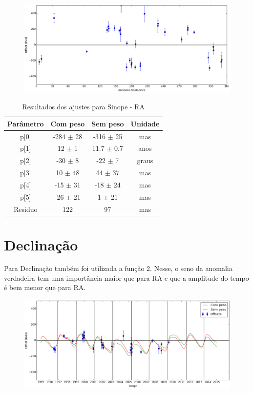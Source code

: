 \documentclass[11pt,a4paper]{report}
\begin{document}
\begin{figure}[h]
\includegraphics[scale=0.45]{Sinope/RA_anom.png}  
\end{figure}


\begin{table}[h!]
\caption{\label{Tab: Sinope-RA} Resultados dos ajustes para Sinope - RA}
\begin{centering}
\begin{tabular}{cccc}
\hline
\hline
Parâmetro & Com peso & Sem peso & Unidade\tabularnewline
\hline
p[0] & -284 $\pm$ 28 & -316 $\pm$ 25 & mas\\
p[1] & 12 $\pm$ 1 & 11.7 $\pm$ 0.7 & anos\\
p[2] & -30 $\pm$ 8 & -22 $\pm$ 7 & graus\\
p[3] & 10 $\pm$ 48 & 44 $\pm$ 37 & mas\\
p[4] & -15 $\pm$ 31 & -18 $\pm$ 24 & mas\\
p[5] & -26 $\pm$ 21 & 1 $\pm$ 21 & mas\\
Residuo & 122 & 97 & mas\\
\hline 
\end{tabular} 
\par\end{centering}
\end{table}

\section*{Declinação}

\indent \indent Para Declinação também foi utilizada a função 2. Nesse, o seno da anomalia verdadeira tem uma importância maior que para RA e que a amplitude do tempo é bem menor que para RA.

\begin{figure}[h]
\includegraphics[scale=0.45]{Sinope/DEC.png} 
\end{figure}
\end{document}
